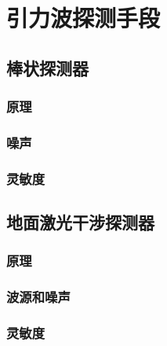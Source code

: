 
\chapter{引力波探测手段}
\label{chap4}

\section{棒状探测器}
\subsection{原理}

\subsection{噪声}

\subsection{灵敏度}


\section{地面激光干涉探测器}
\subsection{原理}

\subsection{波源和噪声}

\subsection{灵敏度}

